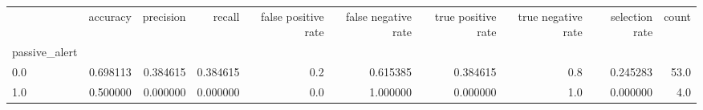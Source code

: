 \begin{tabular}{lrrrrrrrrr}
\toprule
{} &  accuracy &  precision &    recall &  false positive rate &  false negative rate &  true positive rate &  true negative rate &  selection rate &  count \\
passive\_alert &           &            &           &                      &                      &                     &                     &                 &        \\
\midrule
0.0           &  0.698113 &   0.384615 &  0.384615 &                  0.2 &             0.615385 &            0.384615 &                 0.8 &        0.245283 &   53.0 \\
1.0           &  0.500000 &   0.000000 &  0.000000 &                  0.0 &             1.000000 &            0.000000 &                 1.0 &        0.000000 &    4.0 \\
\bottomrule
\end{tabular}
